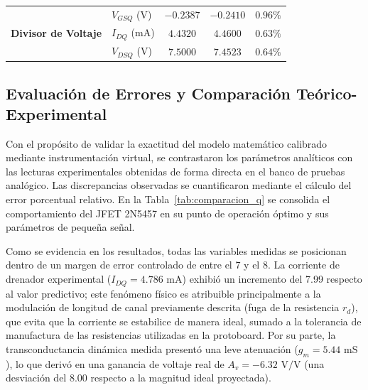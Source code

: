 \documentclass[conference]{IEEEtran}
\begin{document}
\begin{table}[htbp]
{\begin{tabular}{llccc}
            \multirow{3}{*}{\textbf{Divisor de Voltaje}}
                                   & $V_{GSQ}$ (V)      & $-0.2387$                                    & $-0.2410$                                         & $0.96\%$                                                \\
                                   & $I_{DQ}$ (mA)      & $4.4320$                                     & $4.4600$                                          & $0.63\%$                                                \\
                                   & $V_{DSQ}$ (V)      & $7.5000$                                     & $7.4523$                                          & $0.64\%$                                                \\ \bottomrule
        \end{tabular}
    }
\end{table}

\subsection{Evaluación de Errores y Comparación Teórico-Experimental}
Con el propósito de validar la exactitud del modelo matemático calibrado
mediante instrumentación virtual, se contrastaron los parámetros analíticos con
las lecturas experimentales obtenidas de forma directa en el banco de pruebas
analógico. Las discrepancias observadas se cuantificaron mediante el cálculo
del error porcentual relativo. En la Tabla~\ref{tab:comparacion_q} se consolida
el comportamiento del JFET 2N5457 en su punto de operación óptimo y sus
parámetros de pequeña señal.

Como se evidencia en los resultados, todas las variables medidas se posicionan
dentro de un margen de error controlado de entre el \num{7} y el \num{8}. La
corriente de drenador experimental ($I_{DQ} = \num{4.786}\text{ mA}$) exhibió
un incremento del \num{7.99} respecto al valor predictivo; este fenómeno físico
es atribuible principalmente a la modulación de longitud de canal previamente
descrita (fuga de la resistencia $r_d$), que evita que la corriente se
estabilice de manera ideal, sumado a la tolerancia de manufactura de las
resistencias utilizadas en la protoboard. Por su parte, la transconductancia
dinámica medida presentó una leve atenuación ($g_m = \num{5.44}\text{ mS}$), lo
que derivó en una ganancia de voltaje real de $A_v = \num{-6.32}\text{ V/V}$
(una desviación del \num{8.00} respecto a la magnitud ideal proyectada).
\end{document}
